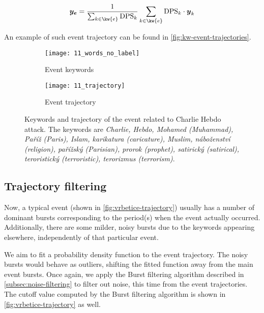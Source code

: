 \begin{equation}
	\vect{\traj_{e}} = \frac{1}{\sum_{k \in \kw{e}}{\text{DPS}_{k}}} \sum_{k \in \kw{e}}{\text{DPS}_{k} \cdot \vect{\traj}_{k}}
\end{equation}

An example of such event trajectory can be found in \autoref{fig:kw-event-trajectories}.


\begin{figure}
\centering
\begin{subfigure}{.5\textwidth}
  \centering
  \texttt{[image: 11\_words\_no\_label]}  %
  \caption{Event keywords}
  \label{fig:hebdo-words}
\end{subfigure}%
\begin{subfigure}{.5\textwidth}
  \centering
  \texttt{[image: 11\_trajectory]}  %
  \caption{Event trajectory}
  \label{fig:hebdo-trajectory}
\end{subfigure}
\caption{Keywords and trajectory of the event related to Charlie Hebdo attack. The keywords are \textit{Charlie, Hebdo, Mohamed (Muhammad), Paříž (Paris), Islam, karikatura (caricature), Muslim, náboženství (religion), pařížský (Parisian), prorok (prophet), satirický (satirical), teroristický (terroristic), terorizmus (terrorism)}.}
\label{fig:kw-event-trajectories}
\end{figure}


\subsection{Trajectory filtering} \label{subsec:trajectory-filtering}

Now, a typical event (shown in \autoref{fig:vrbetice-trajectory}) usually has a number of dominant bursts corresponding to the period(s) when the event actually occurred. Additionally, there are some milder, noisy bursts due to the keywords appearing elsewhere, independently of that particular event.

We aim to fit a probability density function to the event trajectory. The noisy bursts would behave as outliers, shifting the fitted function away from the main event bursts. Once again, we apply the Burst filtering algorithm described in \autoref{subsec:noise-filtering} to filter out noise, this time from the event trajectories. The cutoff value computed by the Burst filtering algorithm is shown in \autoref{fig:vrbetice-trajectory} as well.


